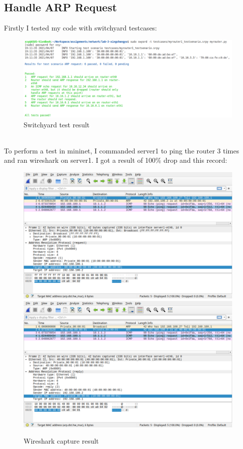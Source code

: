 \documentclass[12pt,a4paper,UTF8]{article}
\begin{document}
\subsection{Handle ARP Request}
Firstly I tested my code with switchyard testcases:
\begin{figure}[htbp]
	\centering
	\includegraphics[width=\textwidth]{4}
	\caption{Switchyard test result}
\end{figure}
\\
To perform a test in mininet, I commanded server1 to ping the router 3 times and ran wireshark on server1. I got a result of 100\% drop and this record:
\begin{figure}[htbp]
	\centering
	\includegraphics[width=\textwidth]{1}
	\includegraphics[width=\textwidth]{2}
	\caption{Wireshark capture result}
\end{figure}
\end{document}
